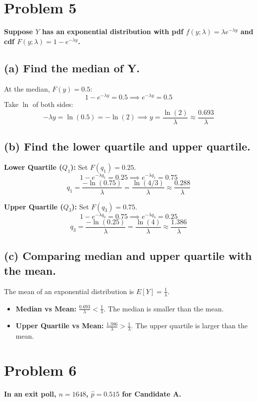 \documentclass[12pt]{article}
\begin{document}
\newpage

\section*{Problem 5}
\textbf{Suppose $Y$ has an exponential distribution with pdf $f(y;\lambda) = \lambda e^{-\lambda y}$ and cdf $F(y;\lambda) = 1 - e^{-\lambda y}$.}

\subsection*{(a) Find the median of Y.}
At the median, $F(y) = 0.5$:
\[ 1 - e^{-\lambda y} = 0.5 \implies e^{-\lambda y} = 0.5 \]
Take $\ln$ of both sides:
\[ -\lambda y = \ln(0.5) = -\ln(2) \implies y = \frac{\ln(2)}{\lambda} \approx \frac{0.693}{\lambda} \]

\subsection*{(b) Find the lower quartile and upper quartile.}
\textbf{Lower Quartile ($Q_1$):} Set $F(q_1) = 0.25$.
\[ 1 - e^{-\lambda q_1} = 0.25 \implies e^{-\lambda q_1} = 0.75 \]
\[ q_1 = \frac{-\ln(0.75)}{\lambda} = \frac{\ln(4/3)}{\lambda} \approx \frac{0.288}{\lambda} \]

\noindent \textbf{Upper Quartile ($Q_3$):} Set $F(q_3) = 0.75$.
\[ 1 - e^{-\lambda q_3} = 0.75 \implies e^{-\lambda q_3} = 0.25 \]
\[ q_3 = \frac{-\ln(0.25)}{\lambda} = \frac{\ln(4)}{\lambda} \approx \frac{1.386}{\lambda} \]

\subsection*{(c) Comparing median and upper quartile with the mean.}
The mean of an exponential distribution is $E[Y] = \frac{1}{\lambda}$.
\begin{itemize}
    \item \textbf{Median vs Mean:} $\frac{0.693}{\lambda} < \frac{1}{\lambda}$. The median is smaller than the mean.
    \item \textbf{Upper Quartile vs Mean:} $\frac{1.386}{\lambda} > \frac{1}{\lambda}$. The upper quartile is larger than the mean.
\end{itemize}

\newpage

\section*{Problem 6}
\textbf{In an exit poll, $n=1648$, $\hat{p} = 0.515$ for Candidate A.}
\end{document}
